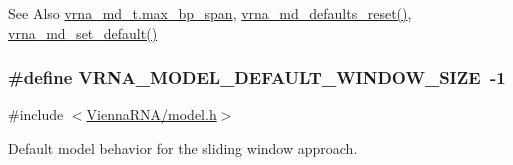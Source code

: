 \begin{DoxySeeAlso}{See Also}
\hyperlink{group__model__details_a659e5fcc6e8c9f1a68e7de6548eef3b0}{vrna\-\_\-md\-\_\-t.\-max\-\_\-bp\-\_\-span}, \hyperlink{group__model__details_ga70834424cf804d149937de89f80ceb45}{vrna\-\_\-md\-\_\-defaults\-\_\-reset()}, \hyperlink{group__model__details_ga8ac6ff84936282436f822644bf841f66}{vrna\-\_\-md\-\_\-set\-\_\-default()} 
\end{DoxySeeAlso}
\hypertarget{group__model__details_ga8de04a9cb57e811e313b0f9f207f6bdb}{
\subsubsection[{V\-R\-N\-A\-\_\-\-M\-O\-D\-E\-L\-\_\-\-D\-E\-F\-A\-U\-L\-T\-\_\-\-W\-I\-N\-D\-O\-W\-\_\-\-S\-I\-Z\-E}]{\setlength{\rightskip}{0pt plus 5cm}\#define V\-R\-N\-A\-\_\-\-M\-O\-D\-E\-L\-\_\-\-D\-E\-F\-A\-U\-L\-T\-\_\-\-W\-I\-N\-D\-O\-W\-\_\-\-S\-I\-Z\-E~-\/1}}\label{group__model__details_ga8de04a9cb57e811e313b0f9f207f6bdb}


{\ttfamily \#include $<$\hyperlink{model_8h}{Vienna\-R\-N\-A/model.\-h}$>$}



Default model behavior for the sliding window approach. 


